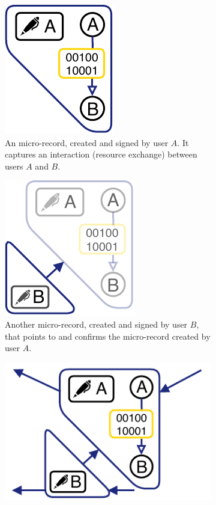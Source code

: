 \begin{figure}[t!]
	\centering
	\begin{subfigure}[t]{.33\textwidth}
		\centering
		\captionsetup{width=.9\linewidth}
		\includegraphics[width=.4\linewidth]{trustchain/assets/tutorial_1}
		\caption{An micro-record, created and signed by user $ A $. It captures an interaction (resource exchange) between users $ A $ and $ B $.}
		\label{fig:trustchain_tutorial_1}
	\end{subfigure}%
	\begin{subfigure}[t]{.33\textwidth}
		\centering
		\captionsetup{width=.89\linewidth}
		\includegraphics[width=.46\linewidth]{trustchain/assets/tutorial_2}
		\caption{Another micro-record, created and signed by user $ B $, that points to and confirms the micro-record created by user $ A $.}
		\label{fig:trustchain_tutorial_2}
	\end{subfigure}%
	\begin{subfigure}[t]{.33\textwidth}
		\centering
		\captionsetup{width=.93\linewidth}
		\includegraphics[width=.7\linewidth]{trustchain/assets/tutorial_3}

\end{subfigure}
\end{figure}
